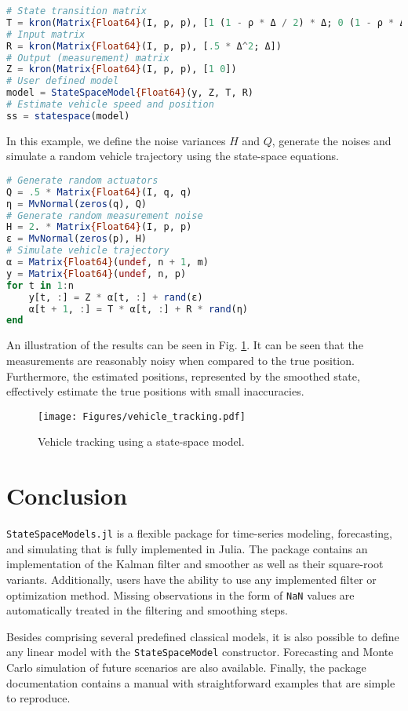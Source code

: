 \documentclass{juliacon}
\begin{document}
\begin{lstlisting}[language = Julia]
# State transition matrix
T = kron(Matrix{Float64}(I, p, p), [1 (1 - ρ * Δ / 2) * Δ; 0 (1 - ρ * Δ)])
# Input matrix
R = kron(Matrix{Float64}(I, p, p), [.5 * Δ^2; Δ])
# Output (measurement) matrix
Z = kron(Matrix{Float64}(I, p, p), [1 0])
# User defined model
model = StateSpaceModel{Float64}(y, Z, T, R)
# Estimate vehicle speed and position
ss = statespace(model)
\end{lstlisting}

In this example, we define the noise variances $H$ and $Q$, generate the noises and simulate a random vehicle trajectory using the state-space equations.
%
\begin{lstlisting}[language = Julia]
# Generate random actuators
Q = .5 * Matrix{Float64}(I, q, q)
η = MvNormal(zeros(q), Q)
# Generate random measurement noise
H = 2. * Matrix{Float64}(I, p, p)
ε = MvNormal(zeros(p), H)
# Simulate vehicle trajectory
α = Matrix{Float64}(undef, n + 1, m)
y = Matrix{Float64}(undef, n, p)
for t in 1:n
    y[t, :] = Z * α[t, :] + rand(ε)
    α[t + 1, :] = T * α[t, :] + R * rand(η)  
end
\end{lstlisting}

An illustration of the results can be seen in Fig. \ref{fig:vehicle_tracking}. It can be seen that the measurements are reasonably noisy when compared to the true position. Furthermore, the estimated positions, represented by the smoothed state, effectively estimate the true positions with small inaccuracies. 
%
\begin{figure}[h]
	\centering
	\texttt{[image: Figures/vehicle\_tracking.pdf]}
	\caption{Vehicle tracking using a state-space model.}
	\label{fig:vehicle_tracking}
\end{figure}

\section{Conclusion} \label{sec:conclusion}

\texttt{StateSpaceModels.jl} is a flexible package for time-series modeling, forecasting, and simulating that is fully implemented in Julia. The package contains an implementation of the Kalman filter and smoother as well as their square-root variants. Additionally, users have the ability to use any implemented filter or optimization method. Missing observations in the form of \texttt{NaN} values are automatically treated in the filtering and smoothing steps. 

Besides comprising several predefined classical models, it is also possible to define any linear model with the \texttt{StateSpaceModel} constructor. Forecasting and Monte Carlo simulation of future scenarios are also available. Finally, the package documentation contains a manual with straightforward examples that are simple to reproduce.


\end{document}
